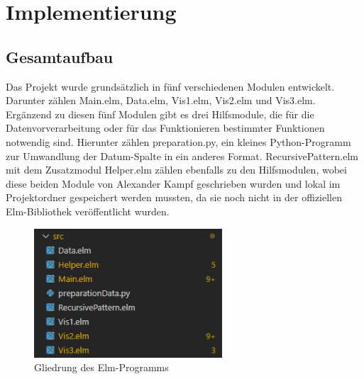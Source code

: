 \documentclass[usegeometry=true]{scrartcl}
\begin{document}
\section{Implementierung}
\subsection{Gesamtaufbau}
Das Projekt wurde grundsätzlich in fünf verschiedenen Modulen entwickelt. Darunter zählen Main.elm, Data.elm, Vis1.elm, Vis2.elm und Vis3.elm. Ergänzend zu diesen fünf Modulen
gibt es drei Hilfsmodule, die für die Datenvorverarbeitung oder für das Funktionieren bestimmter Funktionen notwendig sind. Hierunter zählen preparation.py, ein kleines
Python-Programm zur Umwandlung der Datum-Spalte in ein anderes Format. RecursivePattern.elm mit dem Zusatzmodul Helper.elm zählen ebenfalls zu den Hilfsmodulen, wobei diese beiden
Module von Alexander Kampf geschrieben wurden und lokal im Projektordner gespeichert werden mussten, da sie noch nicht in der offiziellen Elm-Bibliothek veröffentlicht wurden.

\begin{figure} [H]
	\begin{center}
		\includegraphics[width=7cm]{IMG/Modulgliederung}
		\caption{Gliedrung des Elm-Programms}
		\label{fig:Modulgliederung}
	\end{center}
\end{figure}
\end{document}
